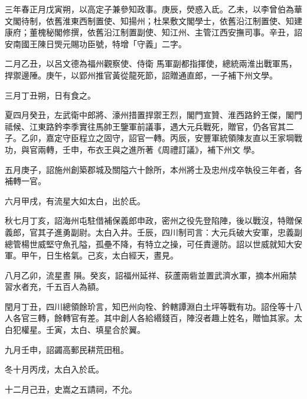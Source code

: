 \begin{pinyinscope}
 三年春正月戊寅朔，以高定子兼參知政事。庚辰，熒惑入氐。乙未，以李曾伯為華文閣待制，依舊淮東西制置使、知揚州；杜杲敷文閣學士，依舊沿江制置使、知建康府；董槐秘閣修撰，依舊沿江制置副使、知江州、主管江西安撫司事。辛丑，詔安南國王陳日煚元賜功臣號，特增「守義」二字。



 二月乙丑，以呂文德為福州觀察使、侍衛
 馬軍副都指揮使，總統兩淮出戰軍馬，捍禦邊陲。庚午，以郢州推官黃從龍死節，詔贈通直郎，一子補下州文學。



 三月丁丑朔，日有食之。



 夏四月癸丑，左武衛中郎將、濠州措置捍禦王烈，閣門宣贊、淮西路鈐王傑，閣門祗候、江東路鈐李季實往馬帥王鑒軍前議事，遇大元兵戰死，贈官，仍各官其二子。乙卯，嘉定守臣程立之固守，詔官一轉。丙辰，安豐軍統領陳友直以王家堈戰功，與官兩轉，壬申，布衣王與之進所著《周禮訂議》，補下州文
 學。



 五月庚子，詔施州創築郡城及關隘六十餘所，本州將士及忠州戍卒執役三年者，各補轉一官。



 六月甲戌，有流星大如太白，出於氐。



 秋七月丁亥，詔海州屯駐借補保義郎申政，密州之役先登陷陣，後以戰沒，特贈保義郎，官其子進勇副尉。太白入井。壬辰，四川制司言：大元兵破大安軍，忠義副總管楊世威堅守魚孔隘，孤壘不降，有特立之操，可任責邊防。詔以世威就知大安軍。甲午，日生格氣。己亥，太白經天，晝見。



 八月乙卯，流星晝
 隕。癸亥，詔福州延祥、荻蘆兩砦並置武濟水軍，摘本州廂禁習水者充，千五百人為額。



 閏月丁丑，四川總領餘玠言，知巴州向牷、鈐轄譚淵白土坪等戰有功。詔佺等十八人各官三轉，餘轉官有差。其中創人各給緡錢百，陣沒者趣上姓名，贈恤其家。太白犯權星。壬寅，太白、填星合於翼。



 九月壬申，詔蠲高郵民耕荒田租。



 冬十月丙戌，太白入於氐。



 十二月己丑，史嵩之五請祠，不允。



\end{pinyinscope}